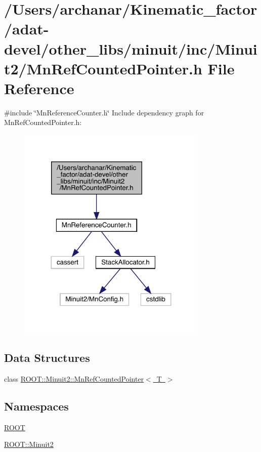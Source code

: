 \hypertarget{adat-devel_2other__libs_2minuit_2inc_2Minuit2_2MnRefCountedPointer_8h}{}\section{/\+Users/archanar/\+Kinematic\+\_\+factor/adat-\/devel/other\+\_\+libs/minuit/inc/\+Minuit2/\+Mn\+Ref\+Counted\+Pointer.h File Reference}
\label{adat-devel_2other__libs_2minuit_2inc_2Minuit2_2MnRefCountedPointer_8h}
{\ttfamily \#include \char`\"{}Mn\+Reference\+Counter.\+h\char`\"{}}\newline
Include dependency graph for Mn\+Ref\+Counted\+Pointer.\+h\+:
\nopagebreak
\begin{figure}[H]
\begin{center}
\leavevmode
\includegraphics[width=257pt]{d6/d9d/adat-devel_2other__libs_2minuit_2inc_2Minuit2_2MnRefCountedPointer_8h__incl}
\end{center}
\end{figure}
\subsection*{Data Structures}
\begin{DoxyCompactItemize}
\item 
class \mbox{\hyperlink{classROOT_1_1Minuit2_1_1MnRefCountedPointer}{R\+O\+O\+T\+::\+Minuit2\+::\+Mn\+Ref\+Counted\+Pointer$<$ T $>$}}
\end{DoxyCompactItemize}
\subsection*{Namespaces}
\begin{DoxyCompactItemize}
\item 
 \mbox{\hyperlink{namespaceROOT}{R\+O\+OT}}
\item 
 \mbox{\hyperlink{namespaceROOT_1_1Minuit2}{R\+O\+O\+T\+::\+Minuit2}}
\end{DoxyCompactItemize}
